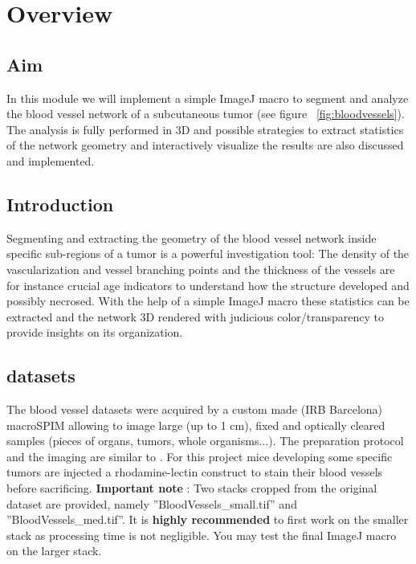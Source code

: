 \section{Overview}

\subsection{Aim}
In this module we will implement a simple ImageJ macro to segment and analyze the blood vessel network of a subcutaneous tumor (see figure ~\ref{fig:bloodvessels}). The analysis is fully performed in 3D and possible strategies to extract statistics of the network geometry and interactively visualize the results are also discussed and implemented.

\subsection{Introduction}
\label{sec:mod8lab0}

Segmenting and extracting the geometry of the blood vessel network inside specific sub-regions of a tumor is a powerful investigation tool: The density of the vascularization and vessel branching points and the thickness of the vessels are for instance crucial age indicators to understand how the structure developed and possibly necrosed. With the help of a simple ImageJ macro these statistics can be extracted and the network 3D rendered with judicious color/transparency to provide insights on its organization.

\subsection{datasets}
The blood vessel datasets were acquired by a custom made (IRB Barcelona) macroSPIM allowing to image large (up to 1 cm), fixed and optically cleared samples (pieces of organs, tumors, whole organisms...). The preparation protocol and the imaging are similar to \cite{jahrling20093d}. For this project mice developing some specific tumors are injected a rhodamine-lectin construct to stain their blood vessels before sacrificing.
\textbf{Important note} : Two stacks cropped from the original dataset are provided, namely ''BloodVessels\_small.tif'' and ''BloodVessels\_med.tif''. It is \textbf{highly recommended} to first work on the smaller stack as processing time is not negligible. You may test the final ImageJ macro on the larger stack.